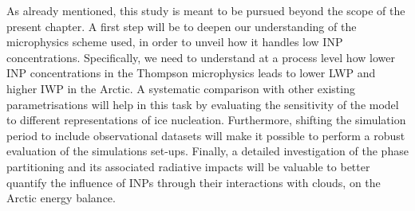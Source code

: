 As already mentioned, this study is meant to be pursued beyond the scope of the present chapter.
A first step will be to deepen our understanding of the microphysics scheme used, in order to unveil how it handles low INP concentrations. 
Specifically, we need to understand at a process level how lower INP concentrations in the Thompson microphysics leads to lower LWP and higher IWP in the Arctic.
A systematic comparison with other existing parametrisations will help in this task by evaluating the sensitivity of the model to different representations of ice nucleation.
Furthermore, shifting the simulation period to include observational datasets will make it possible to perform a robust evaluation of the simulations set-ups.
Finally, a detailed investigation of the phase partitioning and its associated radiative impacts will be valuable to better quantify the influence of INPs through their interactions with clouds, on the Arctic energy balance.


